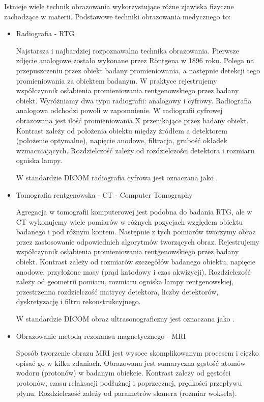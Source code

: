 Istnieje wiele technik obrazowania wykorzystujące różne zjawiska fizyczne zachodzące w materii.
Podstawowe techniki obrazowania medycznego to:
\label{sec:basic-imaging-technics}
\begin{itemize}
    \item Radiografia - RTG

    Najstarsza i najbardziej rozpoznawalna technika obrazowania.
    Pierwsze zdjęcie analogowe zostało wykonane przez Röntgena w 1896 roku.
    Polega na przepuszczeniu przez obiekt badany promieniowania, a następnie detekcji tego promieniowania za obiektem badanym.
    W praktyce rejestrujemy współczynnik osłabienia promieniowania rentgenowskiego przez badany obiekt.
    Wyróżniamy dwa typu radiografii: analogowy i cyfrowy.
    Radiografia analogowa odchodzi powoli w zapomnienie.
    W radiografii cyfrowej obrazowana jest ilość promieniowania X przenikające przez badany obiekt.
    Kontrast zależy od położenia obiektu między źródłem a detektorem (położenie optymalne), napięcie anodowe, filtracja, grubość okładek wzmacniających.
    Rozdzielczość zależy od rozdzielczości detektora i rozmiaru ogniska lampy.

    W standardzie DICOM radiografia cyfrowa jest oznaczana jako .

    \item Tomografia rentgenowska - CT - Computer Tomography
    
    Agregacja w tomografii komputerowej jest podobna do badania RTG, ale w CT wykonujemy wiele pomiarów w różnych pozycjach względem obiektu badanego i pod różnym kontem.
    Następnie z tych pomiarów tworzymy obraz przez zastosowanie odpowiednich algorytmów tworzących obraz.
    Rejestrujemy współczynnik osłabienia promieniowania rentgenowskiego przez badany obiekt.
    Kontrast zależy od rozmiarów szczegółów badanego obiektu, napięcie anodowe, przyłożone masy (prąd katodowy i czas akwizycji).
    Rozdzielczość zależy od geometrii pomiaru, rozmiaru ogniska lampy rentgenowskiej, przestrzenna rozdzielczość matrycy detektora, liczby detektorów, dyskretyzację i filtru rekonstrukcyjnego.

    W standardzie DICOM obraz ultrasonograficzny jest oznaczana jako .

    \item Obrazowanie metodą rezonansu magnetycznego - MRI

    Sposób tworzenie obrazu MRI jest wysoce skomplikowanym procesem i ciężko opisać go w kilku zdaniach.
    Obrazowana jest sumaryczna gęstość atomów wodoru (protonów) w badanym obiekcie.
    Kontrast zależy od gęstości protonów, czasu relaksacji podłużnej i poprzecznej, prędkości przepływu płynu.
    Rozdzielczość zależy od parametrów skanera (rozmiar woksela).
    

\end{itemize}
